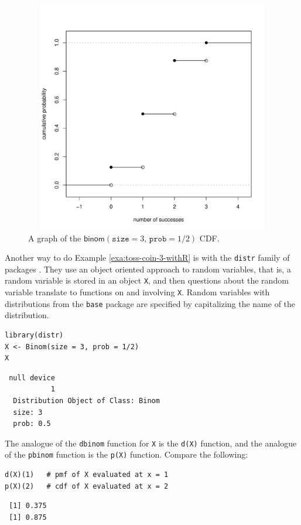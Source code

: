 \documentclass[captions=tableheading]{scrbook}
\begin{document}
\begin{figure}[th]
    \includegraphics[width=5in, height=4in]{img/binom-cdf-base.pdf}
    \caption[Graph of the \(\mathsf{binom}(\mathtt{size}=3,\,\mathtt{prob}=1/2)\) CDF]{\small A graph of the \(\mathsf{binom}(\mathtt{size}=3,\,\mathtt{prob}=1/2)\) CDF.}
    \label{fig:binom-cdf-base}
  \end{figure}

\begin{example}
Another way to do Example \ref{exa:toss-coin-3-withR} is with the \texttt{distr} family of packages \cite{Ruckdescheldistr}. They use an object oriented approach to random variables, that is, a random variable is stored in an object \texttt{X}, and then questions about the random variable translate to functions on and involving \texttt{X}. Random variables with distributions from the \texttt{base} package are specified by capitalizing the name of the distribution.


\begin{verbatim}
library(distr)
X <- Binom(size = 3, prob = 1/2)
X
\end{verbatim}

\begin{verbatim}
 null device 
           1
  Distribution Object of Class: Binom
  size: 3
  prob: 0.5
\end{verbatim}

The analogue of the \texttt{dbinom} function for \texttt{X} is the \texttt{d(X)} function, and the analogue of the \texttt{pbinom} function is the \texttt{p(X)} function. Compare the following:


\begin{verbatim}
d(X)(1)   # pmf of X evaluated at x = 1
p(X)(2)   # cdf of X evaluated at x = 2
\end{verbatim}

\begin{verbatim}
 [1] 0.375
 [1] 0.875
\end{verbatim}

\end{example}
\end{document}
